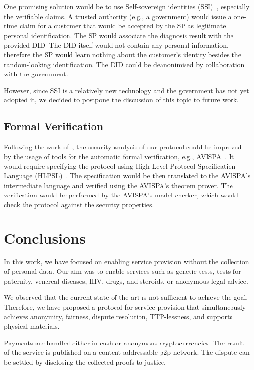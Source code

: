 One promising solution would be to use Self-sovereign identities (SSI)~\cite{muhleSurveyEssentialComponents2018}, especially the verifiable claims. A trusted authority (e.g., a government) would issue a one-time claim for a customer that would be accepted by the SP as legitimate personal identification. The SP would associate the diagnosis result with the provided DID. The DID itself would not contain any personal information, therefore the SP would learn nothing about the customer's identity besides the random-looking identification. The DID could be deanonimised by collaboration with the government.

However, since SSI is a relatively new technology and the government has not yet adopted it, we decided to postpone the discussion of this topic to future work.

\subsection{Formal Verification}\label{sec:formal-verification}
Following the work of~\cite{birjoveanuFormalVerificationMultiparty2022}, the security analysis of our protocol could be improved by the usage of tools for the automatic formal verification, e.g., AVISPA~\cite{armandoAVISPAToolAutomated2005}. It would require specifying the protocol using High-Level Protocol Specification Language (HLPSL)~\cite{chevalierHighLevelProtocol2004}. The specification would be then translated to the AVISPA's intermediate language and verified using the AVISPA's theorem prover. The verification would be performed by the AVISPA's model checker, which would check the protocol against the security properties.

\section{Conclusions}\label{sec:conclusion}
In this work, we have focused on enabling service provision without the collection of personal data. Our aim was to enable services such as genetic tests, tests for paternity, venereal diseases, HIV, drugs, and steroids, or anonymous legal advice.

We observed that the current state of the art is not sufficient to achieve the goal. Therefore, we have proposed a protocol for service provision that simultaneously achieves anonymity, fairness, dispute resolution, TTP-lessness, and supports physical materials.

Payments are handled either in cash or anonymous cryptocurrencies. The result of the service is published on a content-addressable p2p network. The dispute can be settled by disclosing the collected proofs to justice. 

